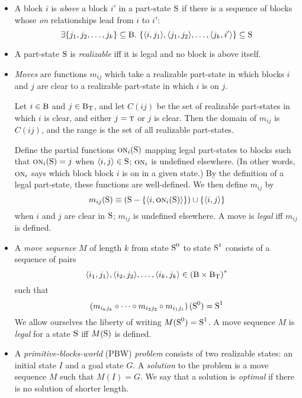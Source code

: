 \documentclass{article}
\newcommand{\have}{{.~}}
\newcommand{\bstate}{{\mbox{\cal S}}}
\newcommand{\blocks}{{\mbox{\cal B}}}
\newcommand{\tabtop}{{\mbox{\sc t}}}
\newcommand{\tblocks}{{\blocks_\tabtop}}
\newcommand{\bon}{{\mbox{\sc on}}}
\begin{document}
\begin{itemize}
\item A block $i$ is {\em above} a block $i'$ in a
part-state $\bstate$ if there is a sequence
of blocks whose {\em on} relationships lead from $i$ to $i'$: $$
  \exists \{ j_1 , j_2 , \ldots , j_k \} \subseteq \blocks \have
    \{ \langle i , j_1 \rangle , \langle j_1 , j_2 \rangle ,
       \ldots , \langle j_k , i' \rangle \} \subseteq \bstate
$$

\item A part-state $\bstate$ is {\em realizable} iff it
is legal and no block is above itself.

\item {\em Moves} are functions $m_{ij}$ which take a realizable part-state in
which blocks $i$ and $j$ are clear to a
realizable part-state in which $i$ is on $j$.

Let $i \in \blocks$ and $j \in \tblocks$, and let $C(ij)$ be the set
of realizable part-states
in which $i$ is clear, and either $j = \tabtop$ or $j$ is clear.
Then the domain of $m_{ij}$ is
$C(ij)$, and the range is the set of all realizable part-states.

Define the partial functions
$\bon_i(\bstate)$ mapping legal part-states to
blocks such that
$\bon_i(\bstate) = j$ when $\langle i, j \rangle \in \bstate$;
$\bon_i$ is undefined elsewhere.
(In other words, $\bon_i$ says
which block block $i$ is on in a given state.)
By the definition of a legal part-state, these functions are well-defined.
We then define
$m_{ij}$ by $$
  m_{ij}(\bstate) \equiv
    \left ( \bstate - \{ \langle i, \bon_i(\bstate) \rangle \} \right )
    \cup \{ \langle i, j \rangle \}
$$
when $i$ and $j$ are clear in $\bstate$; $m_{ij}$ is undefined
elsewhere.  A move is {\em legal} iff $m_{ij}$ is defined.

\item A {\em move sequence} $M$
of length $k$ from state $\bstate^0$ to state $\bstate^1$ consists of
a sequence of pairs $$
  \langle i_1, j_1 \rangle , \langle i_2 , j_2 \rangle , \ldots ,
  \langle i_k , j_k \rangle \in \left ( \blocks \times \tblocks \right ) ^ \ast
$$
such that $$
  \left ( m_{i_k j_k} \circ \cdots \circ m_{i_2 j_2} \circ
  m_{i_1 j_1} \right ) (\bstate^0) = \bstate^1
$$
We allow ourselves the liberty of writing $M(\bstate^0) = \bstate^1$.
A move sequence $M$ is {\em legal} for a state $\bstate$ iff
$M(\bstate)$ is defined.

\item A {\em primitive-blocks-world} (PBW) {\em problem} consists of two
realizable states: an
initial state $I$ and a goal state $G$.
A {\em solution} to the problem is a move sequence $M$ such that $M(I) = G$.
We say that a solution is {\em optimal} if there is no solution
of shorter length.


\end{itemize}
\end{document}
